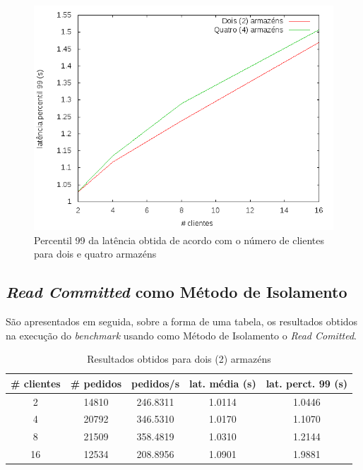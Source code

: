\begin{figure}[!h]
\centering
\includegraphics[scale=.4]{img/questao-1/read-uncom-lat-pct99}
\caption{Percentil 99 da latência obtida de acordo com o número de clientes para dois e quatro armazéns}
\end{figure}

\newpage
\subsection{\textit{Read Committed} como Método de Isolamento}

São apresentados em seguida, sobre a forma de uma tabela, os resultados obtidos na execução do \textit{benchmark} usando como Método de Isolamento o \textit{Read Comitted}.

\begin{table}[!h]
\center
\small
\begin{tabular}{|c|c|c|c|c|}
\hline
\textbf{\# clientes} & \textbf{\# pedidos} & \textbf{pedidos/s} & \textbf{lat. média (s)} & \textbf{lat. perct. 99 (s)}  \\ \hline
2 & 14810 & 246.8311 & 1.0114 & 1.0446  \\ \hline
4 & 20792 & 346.5310 & 1.0170 & 1.1070  \\ \hline
8 & 21509 & 358.4819 & 1.0310 & 1.2144  \\ \hline
16 & 12534 & 208.8956 & 1.0901 & 1.9881  \\ \hline
\end{tabular}
\caption{Resultados obtidos para dois (2) armazéns}
\end{table}

